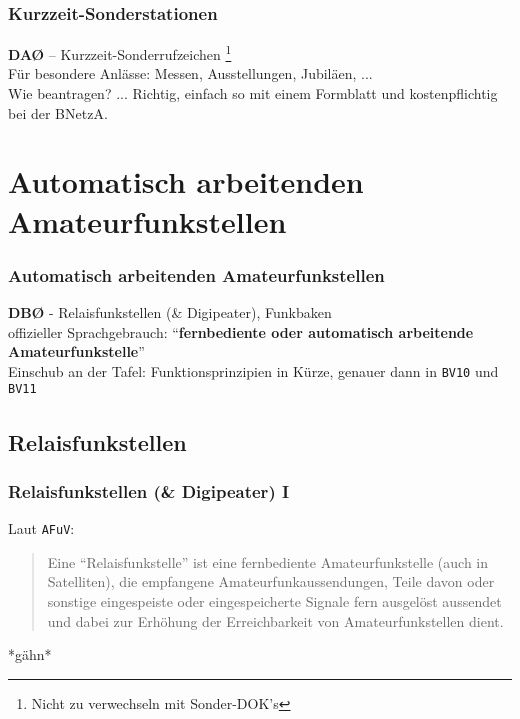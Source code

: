\begin{frame}
  \frametitle{Kurzzeit-Sonderstationen}

  \textbf{DAØ} -- Kurzzeit-Sonderrufzeichen
  \footnote{Nicht zu verwechseln mit Sonder-DOK's}\\[1em]

  Für besondere Anlässe: Messen, Ausstellungen, Jubiläen, ... \\[3em]

  Wie beantragen? ... Richtig, einfach so mit einem Formblatt und
  kostenpflichtig bei der BNetzA.

\end{frame}

\section{Automatisch arbeitenden Amateurfunkstellen}

\begin{frame}
  \frametitle{Automatisch arbeitenden Amateurfunkstellen}

  \textbf{DBØ} - Relaisfunkstellen (\& Digipeater), Funkbaken \\[1em]

  offizieller Sprachgebrauch: ``\textbf{fernbediente oder automatisch arbeitende
  Amateurfunkstelle}'' \\[3em]

  Einschub an der Tafel: Funktionsprinzipien in Kürze, genauer dann in
  \texttt{BV10} und \texttt{BV11}

\end{frame}

\subsection{Relaisfunkstellen}

\begin{frame}
  \frametitle{Relaisfunkstellen (\& Digipeater) I}

  Laut \texttt{AFuV}: \\[1em]

  \begin{quote}
    Eine ``Relaisfunkstelle'' ist eine fernbediente Amateurfunkstelle
    (auch in Satelliten), die empfangene Amateurfunkaussendungen, Teile davon
    oder sonstige eingespeiste oder eingespeicherte Signale fern ausgelöst
    aussendet und dabei zur Erhöhung der Erreichbarkeit von Amateurfunkstellen
    dient.
  \end{quote}
  *gähn*

\end{frame}

